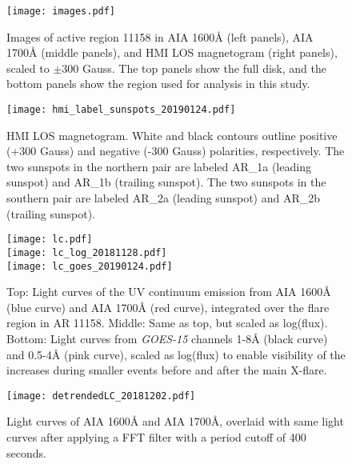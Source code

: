 \begin{figure*}[htb!]\centering
    \texttt{[image: images.pdf]}
    \caption{
        Images of active region 11158 in AIA 1600\AA{} (left panels),
        AIA 1700\AA{} (middle panels), and HMI LOS magnetogram (right panels),
        scaled to $\pm300$ Gauss.
        The top panels show the full disk,
        and the bottom panels show the region used for analysis in this study.
        \label{images2}}
\end{figure*}


\begin{figure}[htb!]\centering
    \texttt{[image: hmi\_label\_sunspots\_20190124.pdf]}
    \caption{
        HMI LOS magnetogram.
        White and black contours outline positive (+300 Gauss)
        and negative (-300 Gauss) polarities, respectively.
        The two sunspots in the northern pair are labeled AR\_1a (leading sunspot)
        and AR\_1b (trailing sunspot).
        The two sunspots in the southern pair are labeled AR\_2a (leading sunspot)
        and AR\_2b (trailing sunspot).
        \label{label}}
\end{figure}


\clearpage
\begin{figure*}[htb!]\centering
    \texttt{[image: lc.pdf]}\\
    \texttt{[image: lc\_log\_20181128.pdf]}\\
    \texttt{[image: lc\_goes\_20190124.pdf]}
    \caption{%
        Top: Light curves of the
        UV continuum emission from AIA 1600\AA{} (blue curve) and
        AIA 1700\AA{} (red curve),
        integrated over the flare region in AR 11158.
        Middle: Same as top, but scaled as log(flux).
        Bottom: Light curves from \textit{GOES-15}
        channels 1-8\AA{} (black curve) and 0.5-4\AA{} (pink curve),
        scaled as log(flux) to enable visibility of the increases
        during smaller events before and
        after the main X-flare.
        \label{lc}}
\end{figure*}


\clearpage
\begin{figure}[htb!]\centering
    \texttt{[image: detrendedLC\_20181202.pdf]}
    \caption{%
        Light curves of AIA 1600\AA{} and AIA 1700\AA{}, overlaid with
        same light curves after applying a FFT filter with a period
        cutoff of 400 seconds.
    \label{detrended}}
\end{figure}

